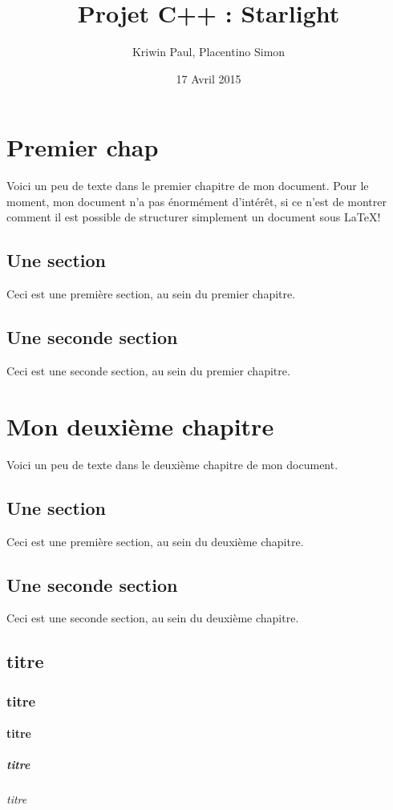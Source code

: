 \documentclass[a4paper,11pt]{report}
\title{Projet C++ : Starlight}
\author{Kriwin Paul, Placentino Simon}
\date{17 Avril 2015}
\begin{document}
\maketitle
\tableofcontents

\chapter{Premier chap}
Voici un peu de texte dans le premier chapitre de mon document. Pour le
moment, mon document n'a pas énormément d'intérêt, si ce n'est de montrer
comment il est possible de structurer simplement un document sous LaTeX!

\section{Une section}
Ceci est une première section, au sein du premier chapitre.

\section{Une seconde section}
Ceci est une seconde section, au sein du premier chapitre.

\chapter{Mon deuxième chapitre}
Voici un peu de texte dans le deuxième chapitre de mon
document.

\section{Une section}
Ceci est une première section, au sein du
deuxième chapitre.

\section{Une seconde section}
Ceci est une seconde section, au sein du
deuxième chapitre.

\section{titre}

\subsection{titre}
\subsubsection{titre}
\paragraph{titre}
\subparagraph{titre}
\end{document}

